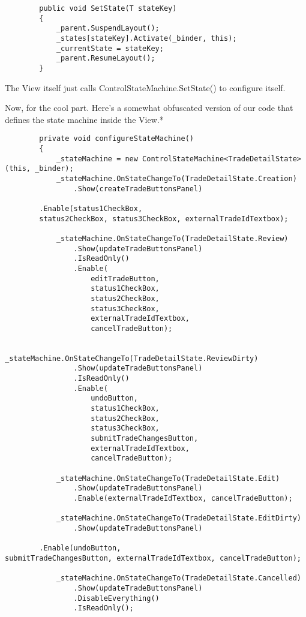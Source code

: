 \documentclass{article}
\begin{document}
{\begin{lstlisting}
        public void SetState(T stateKey)
        {
            _parent.SuspendLayout();
            _states[stateKey].Activate(_binder, this);
            _currentState = stateKey;
            _parent.ResumeLayout();
        }
\end{lstlisting}
\newpage
The View itself just calls ControlStateMachine.SetState() to configure itself.

Now, for the cool part.  Here's a somewhat obfuscated version of our code that defines the state machine inside the View.* 
\begin{lstlisting}
        private void configureStateMachine()
        {
            _stateMachine = new ControlStateMachine<TradeDetailState>(this, _binder);
            _stateMachine.OnStateChangeTo(TradeDetailState.Creation)
                .Show(createTradeButtonsPanel)
        
        .Enable(status1CheckBox, 
		status2CheckBox, status3CheckBox, externalTradeIdTextbox); 

            _stateMachine.OnStateChangeTo(TradeDetailState.Review)
                .Show(updateTradeButtonsPanel)
                .IsReadOnly()
                .Enable(
                    editTradeButton, 
                    status1CheckBox, 
                    status2CheckBox, 
                    status3CheckBox, 
                    externalTradeIdTextbox, 
                    cancelTradeButton); 

            _stateMachine.OnStateChangeTo(TradeDetailState.ReviewDirty)
                .Show(updateTradeButtonsPanel)
                .IsReadOnly()
                .Enable(
                    undoButton, 
                    status1CheckBox, 
                    status2CheckBox, 
                    status3CheckBox, 
                    submitTradeChangesButton, 
                    externalTradeIdTextbox, 
                    cancelTradeButton); 

            _stateMachine.OnStateChangeTo(TradeDetailState.Edit)
                .Show(updateTradeButtonsPanel)
                .Enable(externalTradeIdTextbox, cancelTradeButton); 

            _stateMachine.OnStateChangeTo(TradeDetailState.EditDirty)
                .Show(updateTradeButtonsPanel)
        
        .Enable(undoButton, 
submitTradeChangesButton, externalTradeIdTextbox, cancelTradeButton); 

            _stateMachine.OnStateChangeTo(TradeDetailState.Cancelled)
                .Show(updateTradeButtonsPanel)
                .DisableEverything()
                .IsReadOnly(); 


\end{lstlisting}}
\end{document}
